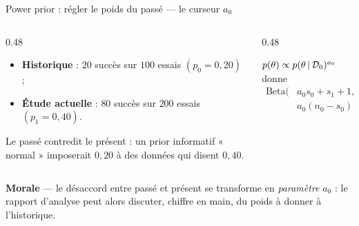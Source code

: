\begin{frame}{Power prior : régler le poids du passé --- le curseur $a_0$}
\begin{columns}[t]
\begin{column}{0.48\textwidth}
\begin{ebox}
\begin{itemize}
  \item \textbf{Historique} : $20$ succès sur $100$ essais $(p_0 = 0{,}20)$ ;
  \item \textbf{Étude actuelle} : $80$ succès sur $200$ essais $(p_1 = 0{,}40)$.
\end{itemize}
Le passé contredit le présent : un prior informatif « normal » imposerait
$0{,}20$ à des données qui disent $0{,}40$.
\end{ebox}
\end{column}
\begin{column}{0.48\textwidth}
\begin{solbox}
$p(\theta) \propto p(\theta \,\vert\, \mathcal{D}_0)^{a_0}$ donne
\[
\begin{aligned}
\mathrm{Beta}\bigl(&a_0 s_0 + s_1 + 1,\\
&a_0 (n_0 - s_0) + (n_1 - s_1) + 1\bigr)
\end{aligned}
\]
\begin{center}
\end{center}
\end{solbox}
\end{column}
\end{columns}
\vspace{1mm}
\centering\small
\textbf{Morale} — le désaccord entre passé et présent se transforme en
\emph{paramètre} $a_0$ : le rapport d'analyse peut alors discuter, chiffre en main,
du poids à donner à l'historique.
\end{frame}

